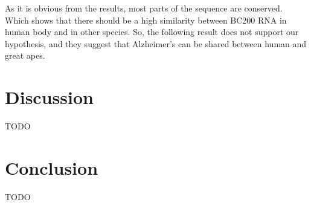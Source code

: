 \documentclass[conference]{IEEEtran}
\begin{document}
As it is obvious from the results, most parts of the sequence are conserved. Which shows that there should be a high similarity between BC200 RNA in human body and in other species. So, the following result does not support our hypothesis, and they suggest that Alzheimer’s can be shared between human and great apes.

\section{Discussion}\label{sec:discussion}
TODO

\section{Conclusion}\label{sec:conclusion}
TODO



\end{document}
